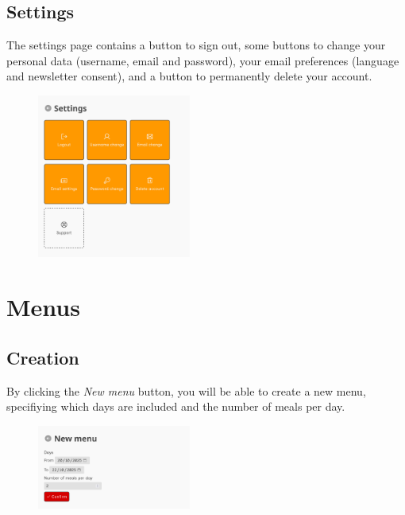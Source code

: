 \documentclass[12pt, a4paper]{article}
\begin{document}
    \subsection{Settings}

    The settings page contains a button to sign out, some buttons to change
    your personal data (username, email and password), your email preferences
    (language and newsletter consent), and a button to permanently
    delete your account.

    \begin{figure}[H]
        \centering
        \includegraphics[width=0.45\textwidth]{assets/en/settings.png}
    \end{figure}


    \section{Menus} \label{menus}

    \subsection{Creation}

    By clicking the \emph{New menu} button, you will be able to create a new
    menu, specifiying which days are included and the number of meals per day.

    \begin{figure}[H]
        \centering
        \includegraphics[width=0.45\textwidth]{assets/en/menu_new.png}
    \end{figure}
\end{document}
